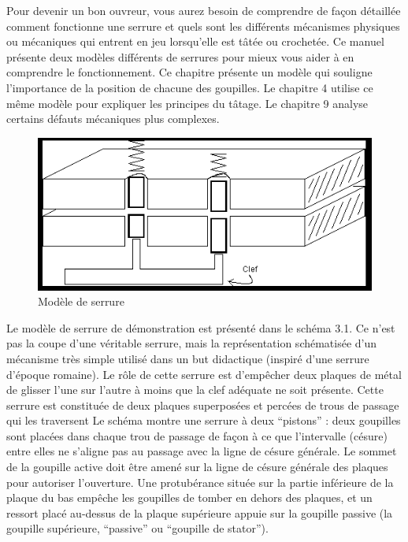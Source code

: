\documentclass[a4paper,french,11pt,twoside]{report}
\begin{document}
Pour devenir un bon ouvreur, vous aurez besoin de comprendre de façon détaillée comment fonctionne une serrure et quels sont les différents mécanismes physiques ou mécaniques qui entrent en jeu lorsqu'elle est tâtée ou crochetée. Ce manuel présente deux modèles différents de serrures pour mieux vous aider à en comprendre le fonctionnement. Ce chapitre présente un modèle qui souligne l'importance de la position de chacune des goupilles. Le chapitre 4 utilise ce même modèle pour expliquer les principes du tâtage. Le chapitre 9 analyse certains défauts mécaniques plus complexes.


\begin{figure}[h] \begin{center}
        \includegraphics[width=16cm]{images/image3_serrure.png}
        \caption{Modèle de serrure}
\end{center} \end{figure}


Le modèle de serrure de démonstration est présenté dans le schéma 3.1. Ce n'est pas la coupe d'une véritable serrure, mais la représentation schématisée d'un mécanisme très simple utilisé dans un but didactique (inspiré d'une serrure d'époque romaine). Le rôle de cette serrure est d'empêcher deux plaques de métal de glisser l'une sur l'autre à moins que la clef adéquate ne soit présente. Cette serrure est constituée de deux plaques superposées et percées de trous de passage qui les traversent Le schéma montre une serrure à deux \enquote{pistons} : deux goupilles sont placées dans chaque trou de passage de façon à ce que l'intervalle (césure) entre elles ne s'aligne pas au passage avec la ligne de césure générale. Le sommet de la goupille active doit être amené sur la ligne de césure générale des plaques pour autoriser l'ouverture. Une protubérance située sur la partie inférieure de la plaque du bas empêche les goupilles de tomber en dehors des plaques, et un ressort placé au-dessus de la plaque supérieure appuie sur la goupille passive (la goupille supérieure, \enquote{passive} ou \enquote{goupille de stator}).
\end{document}
